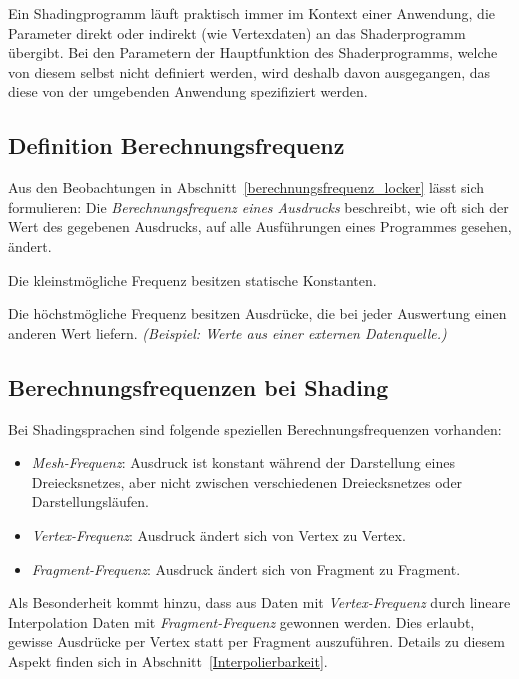 Ein Shadingprogramm läuft praktisch immer im Kontext einer Anwendung, die Parameter direkt oder indirekt (wie
Vertexdaten) an das Shaderprogramm übergibt.
Bei den Parametern der Hauptfunktion des Shaderprogramms, welche von diesem selbst nicht definiert werden,
wird deshalb davon ausgegangen, das diese von der umgebenden Anwendung spezifiziert werden.

\subsection{Definition Berechnungsfrequenz}
\label{Berechnungsfrequenz}

Aus den Beobachtungen in Abschnitt~\ref{berechnungsfrequenz_locker} lässt sich formulieren:
Die \emph{Berechnungsfrequenz eines Ausdrucks} beschreibt, wie oft sich der Wert des gegebenen Ausdrucks, auf alle Ausführungen eines
Programmes gesehen, ändert.

Die kleinstmögliche Frequenz besitzen statische Konstanten.

Die höchstmögliche Frequenz besitzen Ausdrücke, die bei jeder Auswertung einen anderen Wert liefern.
\emph{(Beispiel: Werte aus einer externen Datenquelle.)}

\subsection{Berechnungsfrequenzen bei Shading}

Bei Shadingsprachen sind folgende speziellen Berechnungsfrequenzen vorhanden:
\begin{itemize}
\item \emph{Mesh-Frequenz}: Ausdruck ist konstant während der Darstellung eines Dreiecksnetzes, aber nicht zwischen
verschiedenen Dreiecksnetzes oder Darstellungsläufen. %
\item \emph{Vertex-Frequenz}: Ausdruck ändert sich von Vertex zu Vertex. %
\item \emph{Fragment-Frequenz}: Ausdruck ändert sich von Fragment zu Fragment. %
\end{itemize}

Als Besonderheit kommt hinzu, dass aus Daten mit \emph{Vertex-Frequenz} durch lineare Interpolation Daten mit
\emph{Fragment-Frequenz} gewonnen werden. %
Dies erlaubt, gewisse Ausdrücke per Vertex statt per Fragment auszuführen. Details zu diesem Aspekt finden sich in
Abschnitt~\ref{Interpolierbarkeit}.

